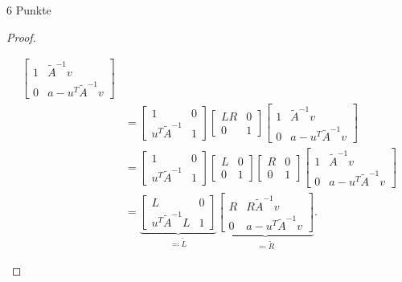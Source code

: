 \documentclass{problemset}
\begin{document}
\begin{problem}{6 Punkte}
\begin{proof}
\begin{enumerate}
\begin{align*}
\begin{bmatrix}
                      1 & \tilde{A}^{-1} v         \\
                      0 & a - u^T \tilde{A}^{-1} v
                  \end{bmatrix}                          \\
                    & = \begin{bmatrix}
                            1                  & 0 \\
                            u^T \tilde{A}^{-1} & 1
                        \end{bmatrix}
                  \begin{bmatrix}
                      L R & 0 \\
                      0   & 1
                  \end{bmatrix}
                  \begin{bmatrix}
                      1 & \tilde{A}^{-1} v         \\
                      0 & a - u^T \tilde{A}^{-1} v
                  \end{bmatrix}                          \\
                    & = \begin{bmatrix}
                            1                  & 0 \\
                            u^T \tilde{A}^{-1} & 1
                        \end{bmatrix}
                  \begin{bmatrix}
                      L & 0 \\
                      0 & 1
                  \end{bmatrix}
                  \begin{bmatrix}
                      R & 0 \\
                      0 & 1
                  \end{bmatrix}
                  \begin{bmatrix}
                      1 & \tilde{A}^{-1} v         \\
                      0 & a - u^T \tilde{A}^{-1} v
                  \end{bmatrix}                          \\
                    & = \underbrace{\begin{bmatrix}
                                            L                    & 0 \\
                                            u^T \tilde{A}^{-1} L & 1
                                        \end{bmatrix}}_{\eqcolon \tilde{L}}
                  \underbrace{
                      \begin{bmatrix}
                          R & R \tilde{A}^{-1} v       \\
                          0 & a - u^T \tilde{A}^{-1} v
                      \end{bmatrix}}_{\eqcolon \tilde{R}}.
              \end{align*}


\end{enumerate}
\end{proof}
\end{problem}
\end{document}
